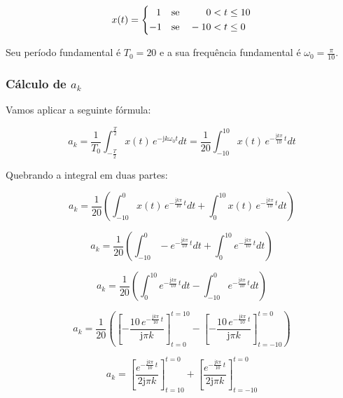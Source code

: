 \documentclass[10pt,twocolumn]{article}
\renewcommand{\j}{\ensuremath{\mathrm{j}}}
\newcommand{\?}{\stackrel{?}{=}}
\begin{document}
\begin{equation*}
	x(t)=\begin{dcases}
		\;\;\,1&\text{se}\quad\quad\;\;\, 0<t\leq10\\
		-1&\text{se}\quad -10<t\leq0
	\end{dcases}
\end{equation*}

Seu período fundamental é $T_0=20$ e a sua frequência fundamental é $\omega_0=\frac{\pi}{10}$.

\subsubsection{Cálculo de $a_k$}

Vamos aplicar a seguinte fórmula:

\begin{equation*}
	a_k=\frac{1}{T_0}\int_{-\frac{T}{2}}^{\frac{T}{2}}x(t)\,e^{-\j k\omega_0t}dt=
	\frac{1}{20}\int_{-10}^{10}x(t)\,e^{-\frac{\j k\pi}{10}\,t}dt
\end{equation*}

Quebrando a integral em duas partes:

\begin{equation*}
	a_k=\frac{1}{20}\left(\int_{-10}^{0}x(t)\,e^{-\frac{\j k\pi}{10}\,t}dt+\int_{0}^{10}x(t)\,e^{-\frac{\j k\pi}{10}\,t}dt\right)
\end{equation*}

\begin{equation*}
	a_k=\frac{1}{20}\left(\int_{-10}^{0}-e^{-\frac{\j k\pi}{10}\,t}dt+\int_{0}^{10}e^{-\frac{\j k\pi}{10}\,t}dt\right)
\end{equation*}

\begin{equation*}
	a_k=\frac{1}{20}\left(\int_{0}^{10}e^{-\frac{\j k\pi}{10}\,t}dt-\int_{-10}^{0}e^{-\frac{\j k\pi}{10}\,t}dt\right)
\end{equation*}

\begin{equation*}
	a_k=\frac{1}{20}\left(\left[-\frac{10\,e^{-\frac{\j k\pi}{10}\,t}}{\j\pi k}\right]_{t=0}^{t=10}-\left[-\frac{10\,e^{-\frac{\j k\pi}{10}\,t}}{\j\pi k}\right]_{t=-10}^{t=0}\right)
\end{equation*}

\begin{equation*}
	a_k=\left[\frac{e^{-\frac{\j k\pi}{10}\,t}}{2\j\pi k}\right]_{t=10}^{t=0}+\left[\frac{e^{-\frac{\j k\pi}{10}\,t}}{2\j\pi k}\right]_{t=-10}^{t=0}
\end{equation*}
\end{document}
